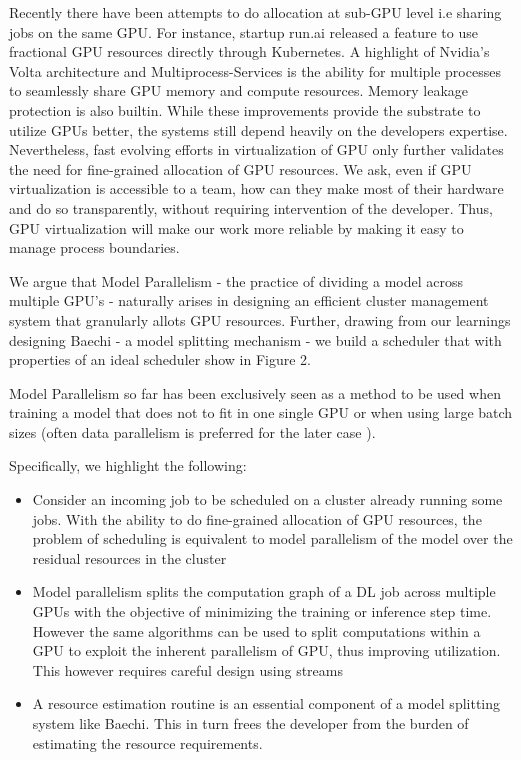 Recently there have been attempts to do allocation at sub-GPU level i.e sharing
jobs on the same GPU. For instance, startup run.ai \cite{runai} released a
feature to use fractional GPU resources directly through Kubernetes. A highlight
of Nvidia's Volta architecture and Multiprocess-Services \cite{mps} is the
ability for multiple processes to seamlessly share GPU memory and compute
resources. Memory leakage protection is also builtin. While these improvements
provide the substrate to utilize GPUs better, the systems still depend heavily
on the developers expertise. Nevertheless, fast evolving efforts in
virtualization of GPU only further validates the need for fine-grained
allocation of GPU resources. We ask, even if GPU virtualization is accessible to
a team, how can they make most of their hardware and do so transparently,
without requiring intervention of the developer. Thus, GPU virtualization will
make our work more reliable by making it easy to manage process boundaries.

We argue that Model Parallelism - the practice of dividing a model across
multiple GPU's - naturally arises in designing an efficient cluster management
system that granularly allots GPU resources. Further, drawing from our
learnings designing Baechi \cite{baechi} - a model splitting mechanism - we
build a scheduler that with properties of an ideal scheduler show in Figure 2.

Model Parallelism so far has been exclusively seen as a method to be used when
training a model that does not to fit in one single GPU or when using large
batch sizes (often data parallelism is preferred for the later case ).

Specifically, we highlight the following:

\begin{itemize}

\item Consider an incoming job to be scheduled on a cluster already running some
jobs. With the ability to do fine-grained allocation of GPU resources, the
problem of scheduling  is equivalent to model parallelism of the model over the
residual resources in the cluster

\item Model parallelism splits the computation graph of a DL job across multiple
GPUs with the objective of minimizing the training or inference step time.
However the same algorithms can be used to split computations within a GPU to
exploit the inherent parallelism of GPU, thus improving utilization. This
however requires careful design using streams \cite{nimble}

\item A resource estimation routine is an essential component of a model
splitting system like Baechi. This in turn frees the developer from the burden
of estimating the resource requirements.

\end{itemize}

